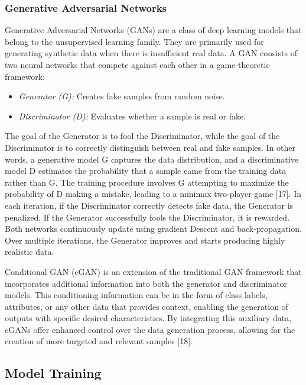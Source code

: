 \documentclass[a4paper, twocolumn, 11pt]{article}
\begin{document}
\subsubsection{Generative Adversarial Networks}
Generative Adversarial Networks (GANs) are a class of deep learning models that belong to the unsupervised learning family. They are primarily used for generating synthetic data when there is insufficient real data. A GAN consists of two neural networks that compete against each other in a game-theoretic framework:
\begin{itemize}
    \item \textit{Generator (G):} Creates fake samples from random noise. 
    \item \textit{Discriminator (D):} Evaluates whether a sample is real or fake. 
\end{itemize}
The goal of the Generator is to fool the Discriminator, while the goal of the Discriminator is to correctly distinguish between real and fake samples. In other words, a generative model G captures the data distribution, and a discriminative model D estimates the probability that a sample came from the training data rather than G. The training procedure involves G attempting to maximize the probability of D making a mistake, leading to a minimax two-player game [17]. In each iteration, if the Discriminator correctly detects fake data, the Generator is penalized. If the Generator successfully fools the Discriminator, it is rewarded. Both networks continuously update using gradient Descent and back-propagation. Over multiple iterations, the Generator improves and starts producing highly realistic data. \par
Conditional GAN (cGAN) is an extension of the traditional GAN framework that incorporates additional information into both the generator and discriminator models. This conditioning information can be in the form of class labels, attributes, or any other data that provides context, enabling the generation of outputs with specific desired characteristics. By integrating this auxiliary data, cGANs offer enhanced control over the data generation process, allowing for the creation of more targeted and relevant samples [18].

\vspace{7pt}

\subsection{Model Training}
\vspace{7pt}
\end{document}
